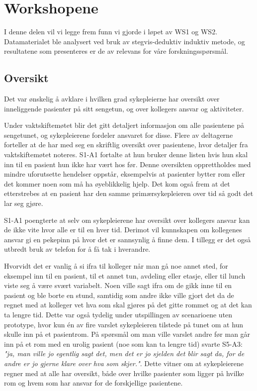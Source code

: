 \section{Workshopene}
\label{ws}
I denne delen vil vi legge frem funn vi gjorde i løpet av WS1 og WS2. Datamaterialet ble analysert ved bruk av stegvis-deduktiv induktiv metode, og resultatene som presenteres er de av relevans for våre forskningsspørsmål.

\subsection{Oversikt}
Det var ønskelig å avklare i hvilken grad sykepleierne har oversikt over inneliggende pasienter på sitt sengetun, og over kollegers ansvar og aktiviteter.

\noindent
Under vaktskiftemøtet blir det gitt detaljert informasjon om alle pasientene på sengetunet, og sykepleierene fordeler ansvaret for disse. Flere av deltagerne forteller at de har med seg en skriftlig oversikt over pasientene, hvor detaljer fra vaktskiftemøtet noteres. S1-A1 fortalte at hun bruker denne listen hvis hun skal inn til en pasient hun ikke har vært hos før. Denne oversikten opprettholdes med mindre uforutsette hendelser oppstår, eksempelvis at pasienter bytter rom eller det kommer noen som må ha øyeblikkelig hjelp. Det kom også frem at det etterstrebes at en pasient har den samme primærsykepleieren over tid så godt det lar seg gjøre.

\noindent
S1-A1 poengterte at selv om sykepleierene har oversikt over kollegers ansvar kan de ikke vite hvor alle er til en hver tid. Derimot vil kunnskapen om kollegenes ansvar gi en pekepinn på hvor det er sannsynlig å finne dem. I tillegg er det også utbredt bruk av telefon for å få tak i hverandre. 

\noindent
Hvorvidt det er vanlig å si ifra til kolleger når man gå noe annet sted, for eksempel inn til en pasient, til et annet tun, avdeling eller etasje, eller til lunch viste seg å være svært variabelt. Noen ville sagt ifra om de gikk inne til en pasient og ble borte en stund, samtidig som andre ikke ville gjort det da de regnet med at kolleger vet hva som skal gjøres på det gitte rommet og at det kan ta lengre tid.
Dette var også tydelig under utspillingen av scenarioene uten prototype, hvor kun én av fire varslet sykepleieren tilstede på tunet om at hun skulle inn på et pasientrom. På spørsmål om man ville varslet andre før man går inn på et rom med en urolig pasient (noe som kan ta lengre tid) svarte S5-A3: \emph{"ja, man ville jo egentlig sagt det, men det er jo sjelden det blir sagt da, for de andre er jo gjerne klare over hva som skjer."}. Dette vitner om at sykepleierene regner med at alle har oversikt, både over hvilke pasienter som ligger på hvilke rom og hvem som har ansvar for de forskjellige pasientene.

